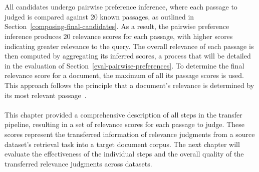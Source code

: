 \\\\
All candidates undergo pairwise preference inference, where each passage to judged is compared against 20 known passages, as outlined in Section~\ref{composing-final-candidates}. As a result, the pairwise preference inference produces 20 relevance scores for each passage, with higher scores indicating greater relevance to the query. The overall relevance of each passage is then computed by aggregating its inferred scores, a process that will be detailed in the evaluation of Section~\ref{eval-pairwise-preferences}. To determine the final relevance score for a document, the maximum of all its passage scores is used. This approach follows the principle that a document's relevance is determined by its most relevant passage~\citep{craswell:2019}.
\\\\
This chapter provided a comprehensive description of all steps in the transfer pipeline, resulting in a set of relevance scores for each passage to judge. These scores represent the transferred information of relevance judgments from a source dataset's retrieval task into a target document corpus. The next chapter will evaluate the effectiveness of the individual steps and the overall quality of the transferred relevance judgments across datasets.
